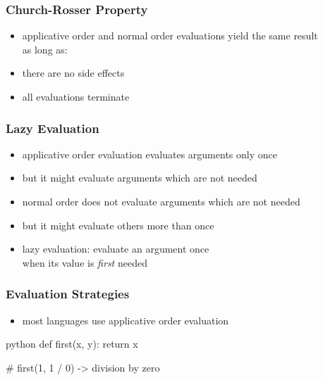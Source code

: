 \documentclass[dvipsnames]{beamer}
\theoremstyle{plain}
\begin{document}
\begin{frame}
  \frametitle{Church-Rosser Property}

  \begin{itemize}
    \item applicative order and normal order evaluations yield the same result\\
      as long as:

    \bigskip
    \item there are no side effects
    \item all evaluations terminate
  \end{itemize}
\end{frame}

\begin{frame}
  \frametitle{Lazy Evaluation}

  \begin{itemize}
    \item applicative order evaluation evaluates arguments only once
    \item but it might evaluate arguments which are not needed

    \pause
    \medskip
    \item normal order does not evaluate arguments which are not needed
    \item but it might evaluate others more than once

    \pause
    \medskip
    \item \alert{lazy evaluation}: evaluate an argument once\\
      when its value is \emph{first} needed
  \end{itemize}
\end{frame}

\begin{frame}[fragile]
  \frametitle{Evaluation Strategies}

  \begin{itemize}
    \item most languages use applicative order evaluation
  \end{itemize}

  \begin{example}[Python]
    \begin{pygments}{python}
def first(x, y):
    return x

# first(1, 1 / 0) -> division by zero
    \end{pygments}
  \end{example}
\end{frame}
\end{document}
